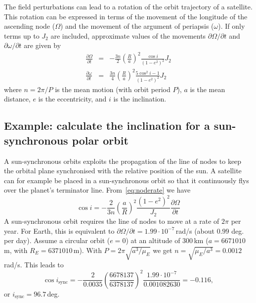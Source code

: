 \documentclass[a4paper]{article}
\begin{document}
The field perturbations can lead to a rotation of the orbit trajectory of a satellite. This rotation can be expressed in terms of the movement of the longitude of the ascending node ($\Omega$) and the movement of the argument of periapsis ($\omega$).
If only terms up to $J_2$ are included, approximate values of the movements $\partial\Omega/\partial t$ and $\partial\omega/\partial t$ are given by
\begin{eqnarray}
\frac{\partial\Omega}{\partial t} &=& -\frac{3 n}{2} \left(\frac{R}{a}\right)^2 \frac{\cos i}{(1-e^2)^2} J_2 \label{eq:noderate} \\
\frac{\partial\omega}{\partial t} &=& \frac{3 n}{4} \left(\frac{R}{a}\right)^2 \frac{5 \cos^2 i - 1}{(1-e^2)^2} J_2
\end{eqnarray}
where $n=2\pi/P$ is the mean motion (with orbit period $P$), $a$ is the mean distance, $e$ is the eccentricity, and $i$ is the inclination.

\subsection*{Example: calculate the inclination for a sun-synchronous polar orbit}
A sun-synchronous orbits exploits the propagation of the line of nodes to keep the orbital plane synchronised with the relative position of the sun. A satellite can for example be placed in a sun-synchronous orbit so that it continuously flys over the planet's terminator line.
From~\ref{eq:noderate} we have
\begin{equation}
\cos i = -\frac{2}{3 n} \left(\frac{a}{R} \right)^2 \frac{(1-e^2)^2}{J_2} \frac{\partial\Omega}{\partial t}
\end{equation}
A sun-synchronous orbit requires the line of nodes to move at a rate of $2\pi$ per year. For Earth, this is equivalent to $\partial\Omega/\partial t = 1.99\cdot 10^{-7}$\,rad/s (about $0.99$ deg. per day). Assume a circular orbit ($e=0$) at an altitude of 300\,km
($a = 6 671 010$\,m, with $R_E = 6 371 010$\,m).
With $P = 2\pi\sqrt{a^3/\mu_E}$ we get $n = \sqrt{\mu_E/a^3} = 0.0012$\,rad/s. This leads to
\begin{equation}
\cos i_\text{sync} = -\frac{2}{0.0035} \left(\frac{6 678 137}{6 378 137}\right)^2 \frac{1.99\cdot 10^{-7}}{0.001082630} = -0.116,
\end{equation}
or $i_\text{sync} = 96.7$\,deg.
%
%
\end{document}
